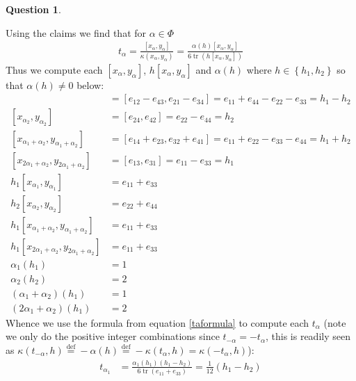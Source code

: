 \documentclass[10.5pt]{article}
\theoremstyle{definition}
\newtheorem{pb}{Question}
\numberwithin{example}{subsection}
\numberwithin{proposition}{subsection}
\newcommand{\set}[1]{\left\{#1\right\}}
\begin{document}
\begin{pb}
\begin{enumerate}
            Using the claims we find that for \(\alpha \in \Phi\)
            \begin{align}
                t_\alpha = \frac{[x_\alpha,y_\alpha]}{\kappa(x_\alpha,y_\alpha)} = \frac{\alpha(h)[x_\alpha,y_\alpha]}{6 \operatorname{tr}(h [x_\alpha,y_\alpha])} \label{taformula}
            \end{align}
            Thus we compute each \([x_\alpha,y_\alpha]\), \(h[x_\alpha,y_\alpha]\) and \(\alpha(h)\) where \(h \in \set{h_1, h_2}\) so that \(\alpha(h) \neq 0\) below:
            \begin{align}
                [x_{\alpha_1},y_{\alpha_1}] &= [e_{12} - e_{43}, e_{21} - e_{34}] = e_{11} + e_{44} - e_{22} - e_{33} = h_1 - h_2 \\
                [x_{\alpha_2},y_{\alpha_2}] &= [e_{24},e_{42}] = e_{22} - e_{44} = h_2 \\
                [x_{\alpha_1 + \alpha_2},y_{\alpha_1 +\alpha_2}] &= [e_{14} + e_{23},e_{32} + e_{41}] = e_{11} + e_{22} - e_{33} - e_{44} = h_1 + h_2 \\
                [x_{2 \alpha_1 + \alpha_2},y_{2 \alpha_1 + \alpha_2}] &= [e_{13},e_{31}] = e_{11} - e_{33} = h_1 \\
                h_1[x_{\alpha_1},y_{\alpha_1}] &= e_{11} + e_{33} \\
                h_2[x_{\alpha_2},y_{\alpha_2}] &= e_{22} + e_{44} \\
                h_1[x_{\alpha_1 + \alpha_2},y_{\alpha_1 + \alpha_2}] &= e_{11} + e_{33} \\
                h_1[x_{2 \alpha_1 + \alpha_2},y_{2 \alpha_1 + \alpha_2}] &= e_{11} + e_{33} \\
                \alpha_1(h_1) &= 1 \\
                \alpha_2(h_2) &= 2 \\
                (\alpha_1 + \alpha_2)(h_1) &= 1 \\
                (2 \alpha_1 + \alpha_2)(h_1) &= 2
            \end{align}
            Whence we use the formula from equation \eqref{taformula} to compute each \(t_\alpha\) (note we only do the positive integer combinations since \(t_{-\alpha} = -t_\alpha\), this is readily seen as \(\kappa(t_{-\alpha},h) \overset{\text{def}}{=} -\alpha(h) \overset{\text{def}}{=} -\kappa(t_\alpha,h) = \kappa(-t_\alpha,h)\)):
            \begin{align}
                t_{\alpha_1} &= \frac{\alpha_1(h_1)(h_1 - h_2)}{6 \operatorname{tr}(e_{11} + e_{33})} = \frac{1}{12}(h_1 - h_2) \\

\end{align}
\end{enumerate}
\end{pb}
\end{document}

